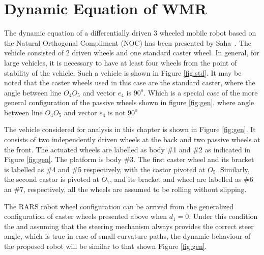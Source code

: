 \section{Dynamic Equation of WMR}
\label{sec:DynamicNoSlip}
The dynamic equation of a differentially driven 3 wheeled mobile robot based on the  Natural Orthogonal Compliment (NOC) has been presented by Saha~\cite{saha1991dynamics}. The vehicle consisted of 2 driven wheels and one standard caster wheel. In general, for large vehicles, it is necessary to have at least four wheels from the point of stability of the vehicle. Such a vehicle  is shown in Figure \ref{fig:std}. It may be noted that the caster wheels used in this case are the standard caster, where the angle between line $O_4O_5$ and vector $e_4$ is  $90^o$. Which is a special case of the more general configuration of the passive wheels shown in figure \ref{fig:gen}, where angle between line $O_4O_5$ and vector $e_4$ is not $90^o$

 The vehicle considered for analysis in this chapter is shown in Figure \ref{fig:gen}. It consists of two independently driven wheels at the back and two passive wheels at the front. The actuated wheels are labelled as body \#1 and \#2 as indicated in Figure \ref{fig:gen}. The platform is body \#3. The first caster wheel and its bracket is labelled as \#4 and \#5 respectively, with the castor pivoted at $O_5$. Similarly, the second castor is pivoted at $O_7$, and its bracket and wheel are labelled as \#6 an \#7, respectively, all the wheels are assumed to be rolling without slipping.  
 
 The RARS robot wheel configuration can be arrived from the generalized configuration of caster wheels presented above when $d_1=0$. Under this condition the and assuming that the steering mechanism always provides the correct steer angle, which is true in case of small curvature paths, the dynamic behaviour of the proposed robot will be similar to that  shown Figure  \ref{fig:gen}.
